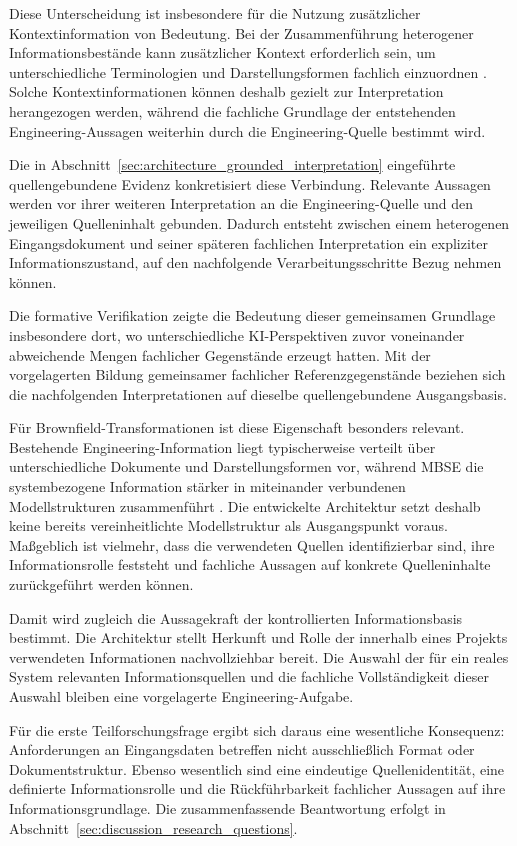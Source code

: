 Diese Unterscheidung ist insbesondere für die Nutzung zusätzlicher
Kontextinformation von Bedeutung. Bei der Zusammenführung heterogener
Informationsbestände kann zusätzlicher Kontext erforderlich sein, um
unterschiedliche Terminologien und Darstellungsformen fachlich einzuordnen
\cite{Bressan.2000}. Solche Kontextinformationen können deshalb gezielt zur
Interpretation herangezogen werden, während die fachliche Grundlage der
entstehenden Engineering-Aussagen weiterhin durch die Engineering-Quelle
bestimmt wird.

Die in Abschnitt~\ref{sec:architecture_grounded_interpretation} eingeführte
quellengebundene Evidenz konkretisiert diese Verbindung. Relevante Aussagen
werden vor ihrer weiteren Interpretation an die Engineering-Quelle und den
jeweiligen Quelleninhalt gebunden. Dadurch entsteht zwischen einem
heterogenen Eingangsdokument und seiner späteren fachlichen Interpretation
ein expliziter Informationszustand, auf den nachfolgende
Verarbeitungsschritte Bezug nehmen können. 

\noindent Die formative Verifikation zeigte
die Bedeutung dieser gemeinsamen Grundlage insbesondere dort, wo
unterschiedliche KI-Perspektiven zuvor voneinander abweichende Mengen
fachlicher Gegenstände erzeugt hatten. Mit der vorgelagerten Bildung
gemeinsamer fachlicher Referenzgegenstände beziehen sich die nachfolgenden
Interpretationen auf dieselbe quellengebundene Ausgangsbasis.

Für Brownfield-Transformationen ist diese Eigenschaft besonders relevant.
Bestehende Engineering-Information liegt typischerweise verteilt über
unterschiedliche Dokumente und Darstellungsformen vor, während MBSE die
systembezogene Information stärker in miteinander verbundenen
Modellstrukturen zusammenführt \cite{Hendriks2022}. Die entwickelte
Architektur setzt deshalb keine bereits vereinheitlichte Modellstruktur als
Ausgangspunkt voraus. Maßgeblich ist vielmehr, dass die verwendeten Quellen
identifizierbar sind, ihre Informationsrolle feststeht und fachliche Aussagen
auf konkrete Quelleninhalte zurückgeführt werden können.

Damit wird zugleich die Aussagekraft der kontrollierten Informationsbasis
bestimmt. Die Architektur stellt Herkunft und Rolle der innerhalb eines
Projekts verwendeten Informationen nachvollziehbar bereit. Die Auswahl der
für ein reales System relevanten Informationsquellen und die fachliche
Vollständigkeit dieser Auswahl bleiben eine vorgelagerte
Engineering-Aufgabe.

Für die erste Teilforschungsfrage ergibt sich daraus eine wesentliche
Konsequenz: Anforderungen an Eingangsdaten betreffen nicht ausschließlich
Format oder Dokumentstruktur. Ebenso wesentlich sind eine eindeutige
Quellenidentität, eine definierte Informationsrolle und die
Rückführbarkeit fachlicher Aussagen auf ihre Informationsgrundlage. Die
zusammenfassende Beantwortung erfolgt in
Abschnitt~\ref{sec:discussion_research_questions}.

